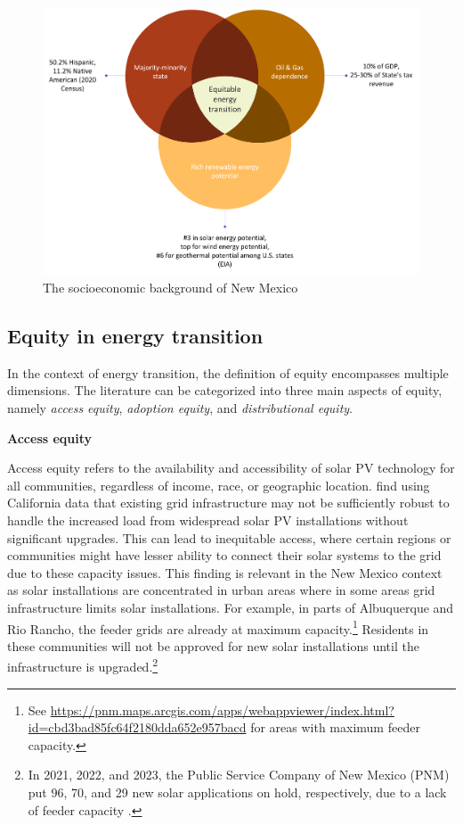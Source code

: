 \documentclass[12pt,twoside,letterpaper]{article}
\begin{document}
\begin{figure}[!ht]
    \centering
    \includegraphics[width=1\textwidth]{figures/nm_background.png}
    \caption{The socioeconomic background of New Mexico}
    \label{fig:nm_background}
\end{figure}

\subsection{Equity in energy transition}

In the context of energy transition, the definition of equity encompasses multiple dimensions. The literature can be categorized into three main aspects of equity, namely \textit{access equity}, \textit{adoption equity}, and \textit{distributional equity}.  

\noindent\textbf{Access equity}

 Access equity refers to the availability and accessibility of solar PV technology for all communities, regardless of income, race, or geographic location. \textcite{brockway2021inequitable} find using California data that existing grid infrastructure may not be sufficiently robust to handle the increased load from widespread solar PV installations without significant upgrades. This can lead to inequitable access, where certain regions or communities might have lesser ability to connect their solar systems to the grid due to these capacity issues. This finding is relevant in the New Mexico context as solar installations are concentrated in urban areas where in some areas grid infrastructure limits solar installations. For example, in parts of Albuquerque and Rio Rancho, the feeder grids are already at maximum capacity.\footnote{See \url{https://pnm.maps.arcgis.com/apps/webappviewer/index.html?id=cbd3bad85fc64f2180dda652e957bacd} for areas with maximum feeder capacity.} Residents in these communities will not be approved for new solar installations until the infrastructure is upgraded.\footnote{In 2021, 2022, and 2023, the Public Service Company of New Mexico (PNM) put 96, 70, and 29 new solar applications on hold, respectively, due to a lack of feeder capacity \parencite{pnm2021,pnm2022,pnm2023}. }
 
\end{document}
